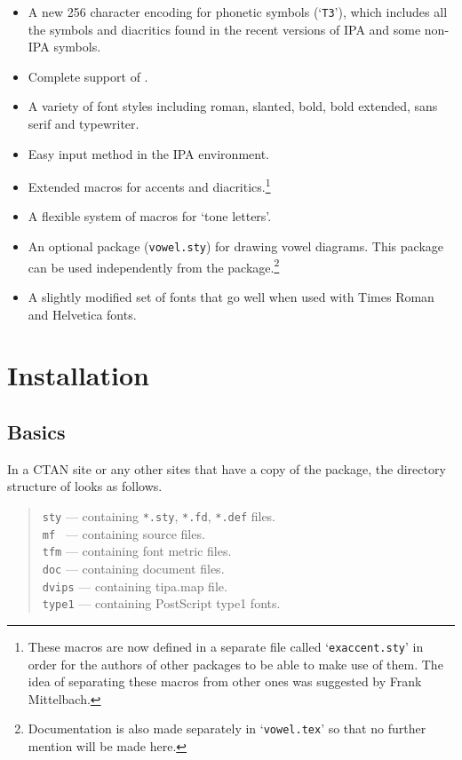 \begin{itemize}
\itemsep0pt
\item A new 256 character encoding for phonetic symbols
  (`\texttt{T3}'), which includes all the symbols and diacritics found
  in the recent versions of IPA and some non-IPA symbols.
\item Complete support of \LaTeXe.
\item A variety of font styles including roman, slanted, bold, bold
  extended, sans serif and typewriter.
\item Easy input method in the IPA environment.
\item Extended macros for accents and diacritics.\footnote{These
    macros are now defined in a separate file called
    `\texttt{exaccent.sty}' in order for the authors of other
    packages to be able to make use of them. The idea of separating
    these macros from other ones was suggested by Frank Mittelbach.}
\item A flexible system of macros for `tone letters'.
\item An optional package (\texttt{vowel.sty}) for drawing vowel
  diagrams. This package can be used independently from the \tipa{}
  package.\footnote{Documentation is also made separately in
    `\texttt{vowel.tex}' so that no further mention will be made
    here.}
\item A slightly modified set of fonts that go well when used with
  Times Roman and Helvetica fonts.
\end{itemize}


\section{Installation}

\subsection{Basics}

In a CTAN site or any other sites that have a copy of the \tipa{}
package, the directory structure of \tipa{} looks as follows.

\begin{quote}
  \verb|sty| --- containing \verb|*.sty|, \verb|*.fd|, \verb|*.def|
  files.\\
  \verb|mf | --- containing \MF{} source files.\\
  \verb|tfm| --- containing font metric files.\\
  \verb|doc| --- containing document files.\\
  \verb|dvips| --- containing tipa.map file.\\
  \verb|type1| --- containing PostScript type1 fonts.
\end{quote}

